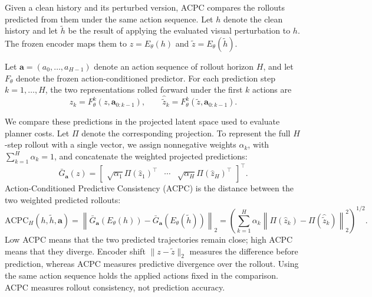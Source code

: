 \documentclass{article}
\begin{document}
Given a clean history and its perturbed version, ACPC compares the rollouts
predicted from them under the same action sequence. Let $h$ denote the clean
history and let $\tilde h$ be the result of applying the evaluated visual
perturbation to $h$. The frozen encoder maps them to $z=E_\theta(h)$ and
$\tilde z=E_\theta(\tilde h)$.

Let $\mathbf a=(a_0,\ldots,a_{H-1})$ denote an action sequence of rollout
horizon $H$, and let $F_\theta$ denote the frozen action-conditioned
predictor. For each prediction step $k=1,\ldots,H$, the two representations
rolled forward under the first $k$ actions are
\begin{equation}
\hat z_k=F_\theta^k(z,\mathbf a_{0:k-1}),
\qquad
\hat{\tilde z}_k=F_\theta^k(\tilde z,\mathbf a_{0:k-1}).
\label{eq:acpc-rollout-objects}
\end{equation}

We compare these predictions in the projected latent space used to evaluate
planner costs. Let $\Pi$ denote the corresponding projection. To represent the
full $H$-step rollout with a single vector, we assign nonnegative weights
$\alpha_k$, with $\sum_{k=1}^H\alpha_k=1$, and concatenate the weighted
projected predictions:
\begin{equation}
\bar G_{\mathbf a}(z)
=
\begin{bmatrix}
\sqrt{\alpha_1}\Pi(\hat z_1)^\top & \cdots &
\sqrt{\alpha_H}\Pi(\hat z_H)^\top
\end{bmatrix}^{\!\top}.
\label{eq:weighted-rollout-map}
\end{equation}
Action-Conditioned Predictive Consistency (ACPC) is the distance between the
two weighted predicted rollouts:
\begin{equation}
\mathrm{ACPC}_H(h,\tilde h,\mathbf a)
=
\left\|\bar G_{\mathbf a}(E_\theta(h))
-\bar G_{\mathbf a}(E_\theta(\tilde h))\right\|_2
=
\left(
\sum_{k=1}^H\alpha_k
\left\|\Pi(\hat z_k)-\Pi(\hat{\tilde z}_k)\right\|_2^2
\right)^{1/2}.
\label{eq:acpc-h}
\end{equation}
Low ACPC means that the two predicted trajectories remain close; high ACPC
means that they diverge. Encoder shift $\|z-\tilde z\|_2$ measures the
difference before prediction, whereas ACPC measures predictive divergence over
the rollout. Using the same action sequence holds the applied actions fixed in
the comparison. ACPC measures rollout consistency, not prediction accuracy.


\end{document}
